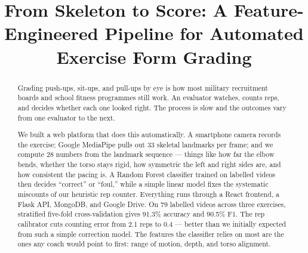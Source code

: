 \documentclass[conference]{IEEEtran}
\begin{document}
\title{From Skeleton to Score: A Feature-Engineered Pipeline for Automated Exercise Form Grading\\
}

\author{
\and
{}
}

\maketitle

\begin{abstract}
Grading push-ups, sit-ups, and pull-ups by eye is how most military recruitment boards and school fitness programmes still work. An evaluator watches, counts reps, and decides whether each one looked right. The process is slow and the outcomes vary from one evaluator to the next.

We built a web platform that does this automatically. A smartphone camera records the exercise; Google MediaPipe pulls out 33 skeletal landmarks per frame; and we compute 28 numbers from the landmark sequence --- things like how far the elbow bends, whether the torso stays rigid, how symmetric the left and right sides are, and how consistent the pacing is. A Random Forest classifier trained on labelled videos then decides ``correct'' or ``foul,'' while a simple linear model fixes the systematic miscounts of our heuristic rep counter. Everything runs through a React frontend, a Flask API, MongoDB, and Google Drive. On 79 labelled videos across three exercises, stratified five-fold cross-validation gives 91.3\% accuracy and 90.5\% F1. The rep calibrator cuts counting error from 2.1 reps to 0.4 --- better than we initially expected from such a simple correction model. The features the classifier relies on most are the ones any coach would point to first: range of motion, depth, and torso alignment.
\end{abstract}
\end{document}
